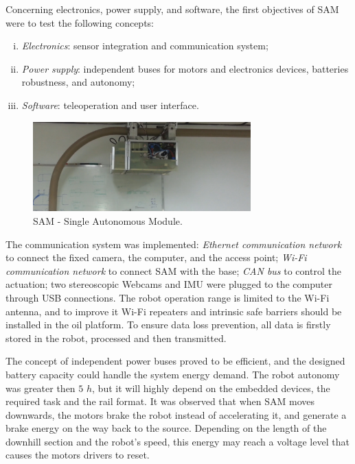 \documentclass{ifacconf}
\begin{document}
Concerning electronics, power supply, and software, the first objectives of SAM were to test the following concepts:
\begin{enumerate}[i)]
  \item \emph{Electronics}: sensor integration and communication system;
  \item \emph{Power supply}: independent buses for motors and electronics
  devices, batteries robustness, and autonomy;
  \item \emph{Software}: teleoperation and user interface.
  \end{enumerate}

\begin{figure}[!h]
\centering
\includegraphics[width=8.4cm]{figs/SAM4.jpg}
\caption{SAM - Single Autonomous Module.}
\label{fig:SAM2}
\end{figure}

The communication system was implemented: \emph{Ethernet communication network}
to connect the fixed camera, the computer, and the access point; \emph{Wi-Fi
communication network} to connect SAM with the base; \emph{CAN bus} to
control the actuation; two stereoscopic Webcams and IMU were plugged to the
computer through USB connections. The robot operation range is
limited to the Wi-Fi antenna, and to improve it Wi-Fi
repeaters and intrinsic safe barriers should be installed in the oil platform.
To ensure data loss prevention, all data is firstly stored in the robot, processed and
then transmitted.

The concept of independent power buses proved to be efficient, and the designed
battery capacity could handle the system energy demand. The robot autonomy was
greater then $5$ $h$, but it will highly depend on the embedded devices, the
required task and the rail format. It was observed that when SAM moves
downwards, the motors brake the robot instead of accelerating it, and generate
a brake energy on the way back to the source. Depending on the length of the
downhill section and the robot's speed, this energy may reach a voltage level
that causes the motors drivers to reset. 
\end{document}
